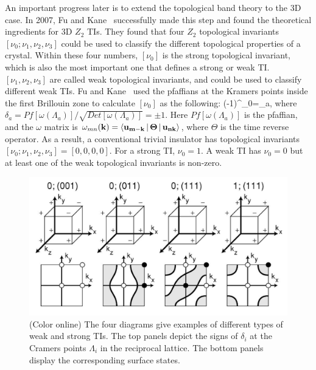An important progress later is to extend the topological band theory to the 3D case. In 2007, Fu and Kane~\cite{FuKane07, Fu07} successfully made this step and found the theoretical ingredients for 3D $Z_2$ TIs. They found that four $Z_2$ topological invariants $[\nu_0; \nu_1, \nu_2, \nu_3]$ could be used to classify the different topological properties of a crystal. Within these four numbers, $[\nu_0]$ is the strong topological invariant, which is also the most important one that defines a strong or weak TI. $[\nu_1, \nu_2, \nu_3]$ are called weak topological invariants, and could be used to classify different weak TIs. Fu and Kane~\cite{FuKane07} used the pfaffians at the Kramers points inside the first Brillouin zone to calculate $[\nu_0]$ as the following:
\be
(-1)^{\nu_0}=\prod \delta_a, 
\label{eq:nu0}
\ee
where $\delta_a = Pf[\omega(\Lambda_a)]/\sqrt{Det[\omega(\Lambda_a)]} = \pm1$. Here $Pf[\omega(\Lambda_a)]$ is the pfaffian, and the $
\omega$ matrix is $\omega_{mn}(\bf k) = \Braket{u_{m -k}|\Theta|u_{nk}}$, where $\Theta$ is the time reverse operator. As a result, a 
conventional trivial insulator has topological invariants $[\nu_0; \nu_1, \nu_2, \nu_3] = [0, 0, 0, 0]$. For a strong TI, $\nu_0=1$. A weak TI has $\nu_0=0$ but at least one of the weak topological invariants is non-zero.

\begin{figure}[htb]
  \begin{center}            
\includegraphics[width=0.9\linewidth]{ch-intro/figures/TI_class.pdf} 
\caption{\label{TI_class} (Color online) 
The four diagrams give examples of different types of weak and strong TIs. The top panels depict the signs of $\delta_i$ at the Cramers points $\Lambda_i$ in the reciprocal lattice. The bottom panels display the corresponding surface states.
} 
  \end{center}
\end{figure}


